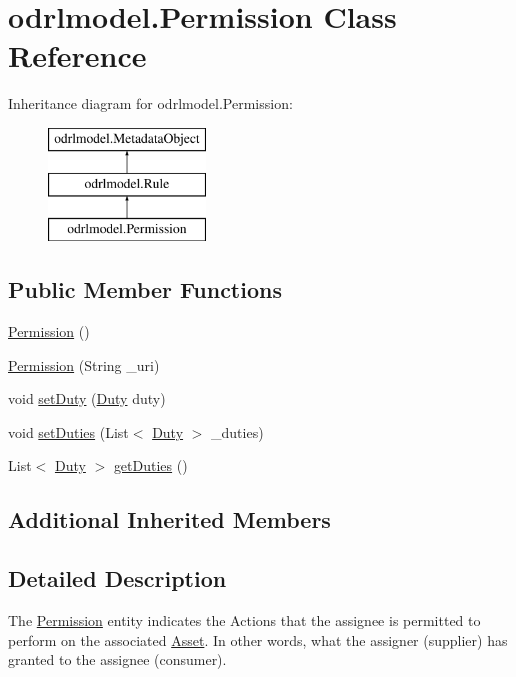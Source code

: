 \hypertarget{classodrlmodel_1_1_permission}{\section{odrlmodel.\-Permission Class Reference}
\label{classodrlmodel_1_1_permission}
}
Inheritance diagram for odrlmodel.\-Permission\-:\begin{figure}[H]
\begin{center}
\leavevmode
\includegraphics[height=3.000000cm]{classodrlmodel_1_1_permission}
\end{center}
\end{figure}
\subsection*{Public Member Functions}
\begin{DoxyCompactItemize}
\item 
\hyperlink{classodrlmodel_1_1_permission_ac5e432bdda9d75997a93c22fb7d53091}{Permission} ()
\item 
\hyperlink{classodrlmodel_1_1_permission_a28aa45d6c1aa9ad63ec4e7ce43a14a7b}{Permission} (String \-\_\-uri)
\item 
void \hyperlink{classodrlmodel_1_1_permission_a9424e5529df4b49a28a882bd19eb2176}{set\-Duty} (\hyperlink{classodrlmodel_1_1_duty}{Duty} duty)
\item 
void \hyperlink{classodrlmodel_1_1_permission_ac239fbe0c792b3cfe74a2765e5f72a21}{set\-Duties} (List$<$ \hyperlink{classodrlmodel_1_1_duty}{Duty} $>$ \-\_\-duties)
\item 
List$<$ \hyperlink{classodrlmodel_1_1_duty}{Duty} $>$ \hyperlink{classodrlmodel_1_1_permission_a10e8e0171aadc06457192b15cd12bc00}{get\-Duties} ()
\end{DoxyCompactItemize}
\subsection*{Additional Inherited Members}


\subsection{Detailed Description}
The \hyperlink{classodrlmodel_1_1_permission}{Permission} entity indicates the Actions that the assignee is permitted to perform on the associated \hyperlink{classodrlmodel_1_1_asset}{Asset}. In other words, what the assigner (supplier) has granted to the assignee (consumer).

